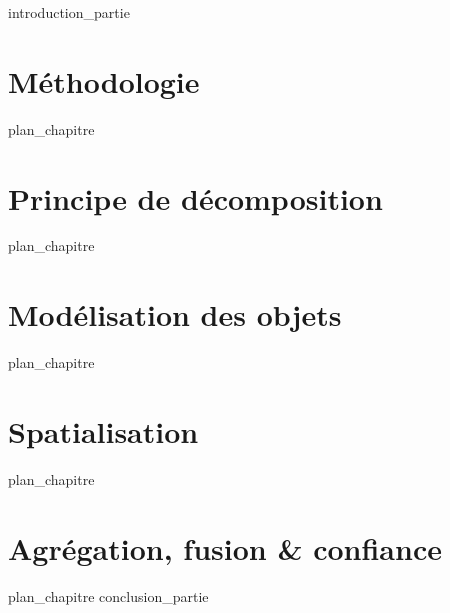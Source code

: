 \label{part:02_int}
{introduction_partie}
%
\chapter{Méthodologie}
\label{chap:04}
{plan_chapitre}
%
\chapter{Principe de décomposition}
\label{chap:05}
{plan_chapitre}
%
\chapter{Modélisation des objets}
\label{chap:06}
{plan_chapitre}
%
%
\chapter{Spatialisation}
\label{chap:07}
{plan_chapitre}
%
\chapter{Agrégation, fusion \& confiance}
\label{chap:08}
{plan_chapitre}
%
\label{part:02_cnc}
{conclusion_partie}
